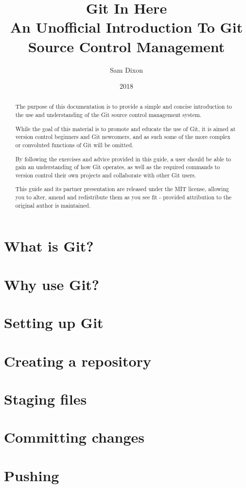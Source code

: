 \documentclass[11pt, a4paper, draft, titlepage]{article}
\begin{document}
\title{
    Git In Here\\
    \large An Unofficial Introduction To Git Source Control Management 
}
\author{Sam Dixon}
\date{2018}
\maketitle

\begin{abstract}
The purpose of this documentation is to provide a simple and concise introduction
to the use and understanding of the Git source control management system.

While the goal of this material is to promote and educate the use of Git, it
is aimed at version control beginners and Git newcomers, and as such some of 
the more complex or convoluted functions of Git will be omitted.

By following the exercises and advice provided in this guide, a user should be
able to gain an understanding of how Git operates, as well as the required
commands to version control their own projects and collaborate with other Git
users.

This guide and its partner presentation are released under the MIT license,
allowing you to alter, amend and redistribute them as you see fit - provided
attribution to the original author is maintained.
\end{abstract}

\tableofcontents
\pagebreak


\section{What is Git?}

\section{Why use Git?}

\section{Setting up Git}

\section{Creating a repository}

\section{Staging files}

\section{Committing changes}

\section{Pushing}
\end{document}
